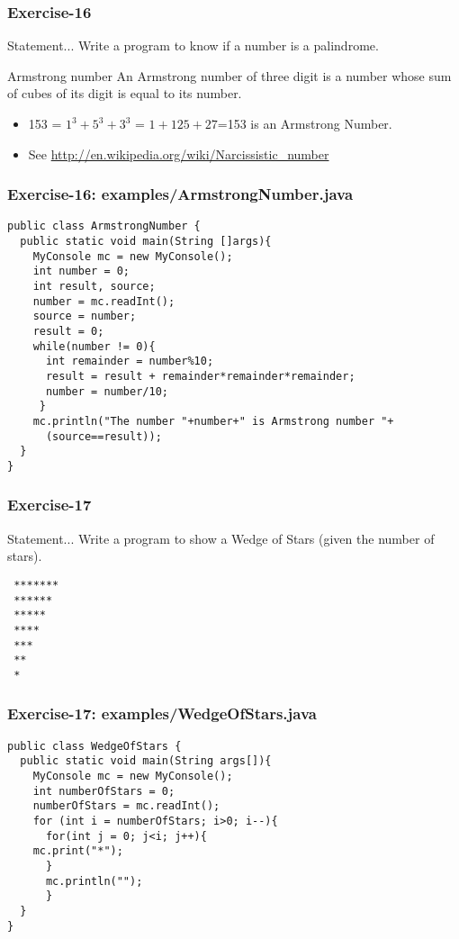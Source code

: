 \documentclass[xcolor=dvipsnames,dvip,notes=show,handout,table]{beamer}
\begin{document}
\begin{frame}[fragile]
\frametitle{Exercise-16}
\begin{block}{Statement...}
 Write a program to know if a number is a palindrome.
\end{block}

\begin{exampleblock}{Armstrong number}
 An Armstrong number of three digit is a number whose sum of cubes of its digit is equal to its number. 
  \begin{itemize}
   \item  153 = $1^3+5^3+3^3$ = $1+125+27$=153 is an Armstrong Number.
   \item  See \url{http://en.wikipedia.org/wiki/Narcissistic\_number}
  \end{itemize}

\end{exampleblock}


\end{frame}


\begin{frame}[fragile]
\frametitle{Exercise-16: examples/ArmstrongNumber.java}
\scriptsize
\begin{lstlisting}
public class ArmstrongNumber {
  public static void main(String []args){
    MyConsole mc = new MyConsole();
    int number = 0;
    int result, source;
    number = mc.readInt();
    source = number;
    result = 0;
    while(number != 0){
      int remainder = number%10;
      result = result + remainder*remainder*remainder;
      number = number/10;
     }
    mc.println("The number "+number+" is Armstrong number "+
      (source==result));        
  }
}
\end{lstlisting}
\end{frame}


\begin{frame}[fragile]
\frametitle{Exercise-17}
\begin{block}{Statement...}
 Write a program to show a Wedge of Stars (given the number of stars).
\end{block}

\begin{lstlisting}
 *******
 ******
 *****
 ****
 ***
 **
 *
\end{lstlisting}



\end{frame}


\begin{frame}[fragile]
\frametitle{Exercise-17: examples/WedgeOfStars.java}
\scriptsize
\begin{lstlisting}
public class WedgeOfStars {
  public static void main(String args[]){
    MyConsole mc = new MyConsole();
    int numberOfStars = 0;
    numberOfStars = mc.readInt();
    for (int i = numberOfStars; i>0; i--){
      for(int j = 0; j<i; j++){
	mc.print("*");
      }
      mc.println("");
      }
  }
}
\end{lstlisting}
\end{frame}
\end{document}
